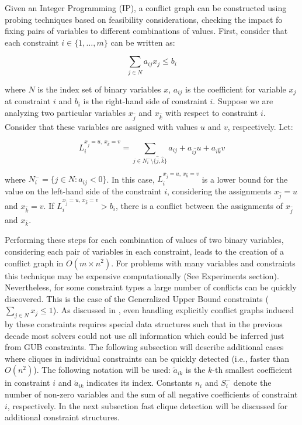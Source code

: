 \documentclass{endm}
\begin{document}
Given an Integer Programming (IP), a conflict graph can be constructed using probing techniques based on feasibility considerations\cite{atamturk,achterberg,sandholm}, checking the impact fo fixing pairs of variables to different combinations of values. First, consider that each constraint $i \in \{1,\ldots,m\}$ can be written as:

\begin{equation}
 \sum_{j \in N} a_{ij}x_{j} \leq b_{i} 
\end{equation}

\noindent where $N$ is the index set of binary variables $x$, $a_{ij}$ is the coefficient for variable $x_{j}$ at constraint $i$ and $b_{i}$ is the right-hand side of constraint $i$. Suppose we are analyzing two particular variables $x_{\hat{j}}$ and $x_{\hat{k}}$ with respect to constraint $i$. Consider that these variables are assigned with values $u$ and $v$, respectively. Let:

\begin{equation}\label{li}
L_{i}^{x_{\hat{j}} = u,\, x_{\hat{k}} = v}=\sum_{j\in N_{i}^{-} \setminus \{\hat{j}, \hat{k}\}}a_{ij}+a_{i\hat{j}}u+a_{i\hat{k}}v 
\end{equation}

\noindent where $N_{i}^{-} = \{j \in N : a_{ij} < 0\}$. In this case, $L_{i}^{x_{\hat{j}} = u,\, x_{\hat{k}} = v}$ is a lower bound for the value on the left-hand side  of the constraint $i$, considering the assignments $x_{\hat{j}} = u$ and $x_{\hat{k}} = v$. If $L_{i}^{x_{\hat{j}} = u,\, x_{\hat{k}} = v} > b_{i}$, there is a conflict between the assignments of $x_{\hat{j}}$ and $x_{\hat{k}}$. 

Performing these steps for each combination of values of two binary variables, considering each pair of variables in each constraint, leads to the creation of a conflict graph in $O(m \times n^2)$. For problems with many variables and constraints this technique may be expensive computationally (See Experiments section). Nevertheless, for some constraint types a large number of conflicts can be quickly discovered. This is the case of the Generalized Upper Bound constraints ($\sum_{j\in N}x_j \leq 1$). As discussed in \cite{atamturk}, even handling explicitly conflict graphs induced by these constraints requires special data structures such that in the previous decade most solvers could not use all information which could be inferred just from GUB constraints. The following subsection will describe additional cases where cliques in individual constraints can be quickly detected (i.e., faster than $O(n^2)$). The following notation will be used: $\tilde{a}_{ik}$ is the $k$-th smallest coefficient in constraint $i$ and $\acute{a}_{ik}$ indicates its index. Constants $n_i$ and $S_i^-$ denote the number of non-zero variables and the sum of all negative coefficients of constraint $i$, respectively. In the next subsection fast clique detection will be discussed for additional constraint structures.
\end{document}
